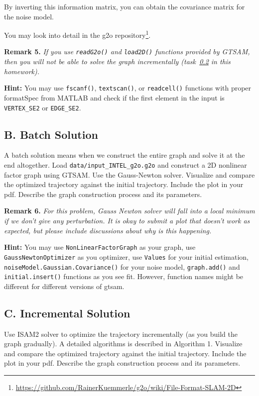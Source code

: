 \documentclass[tp]{lcc}
\begin{document}
By inverting this information matrix, you can obtain the covariance matrix for the noise model.

You may look into detail in the g2o repository\footnote{\url{https://github.com/RainerKuemmerle/g2o/wiki/File-Format-SLAM-2D}}.

\textbf{Remark 5.} \textit{If you use \lstinline[style=bash]{readG2o()} and \lstinline[style=bash]{load2D()} functions provided by GTSAM, then you will not be able to solve the graph incrementally (task~\ref{sec:incremental_solution} in this homework).}

\textbf{Hint:} You may use \lstinline[style=bash]{fscanf()}, \lstinline[style=bash]{textscan()}, or \lstinline[style=bash]{readcell()} functions with proper formatSpec from MATLAB and check if the first element in the input is \lstinline[style=bash]{VERTEX_SE2} or \lstinline[style=bash]{EDGE_SE2}.

\subsection{B. Batch Solution}
A batch solution means when we construct the entire graph and solve it at the end altogether. Load \lstinline[style=bash]{data/input_INTEL_g2o.g2o} and construct a 2D nonlinear factor graph using GTSAM. Use the Gauss-Newton solver. Visualize and compare the optimized trajectory against the initial trajectory. Include the plot in your pdf. Describe the graph construction process and its parameters.

\textbf{Remark 6.} \textit{For this problem, Gauss Newton solver will fall into a local minimum if we don't give any perturbation. It is okay to submit a plot that doesn't work as expected, but please include discussions about why is this happening.}

\textbf{Hint:} You may use \lstinline[style=bash]{NonLinearFactorGraph} as your graph, use \lstinline[style=bash]{GaussNewtonOptimizer} as you optimizer, use \lstinline[style=bash]{Values} for your initial estimation, \lstinline[style=bash]{noiseModel.Gaussian.Covariance()} for your noise model, \lstinline[style=bash]{graph.add()} and \lstinline[style=bash]{initial.insert()} functions as you see fit. However, function names might be different for different versions of gtsam.

\subsection{C. Incremental Solution}
\label{sec:incremental_solution}
Use ISAM2 solver to optimize the trajectory incrementally (as you build the graph gradually). A detailed algorithms is described in Algorithm 1. Visualize and compare the optimized trajectory against the initial trajectory. Include the plot in your pdf. Describe the graph construction process and its parameters.
\end{document}
